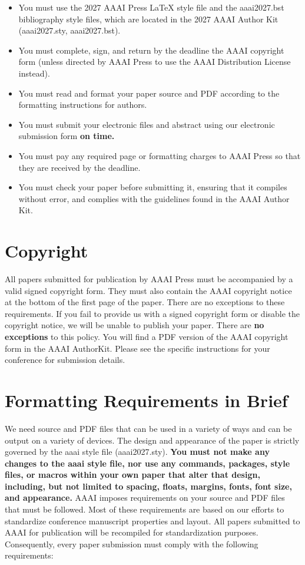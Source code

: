 \documentclass[letterpaper]{article} %
\begin{document}
\begin{itemize}
\item You must use the 2027 AAAI Press \LaTeX{} style file and the aaai2027.bst bibliography style files, which are located in the 2027 AAAI Author Kit (aaai2027.sty, aaai2027.bst).
\item You must complete, sign, and return by the deadline the AAAI copyright form (unless directed by AAAI Press to use the AAAI Distribution License instead).
\item You must read and format your paper source and PDF according to the formatting instructions for authors.
\item You must submit your electronic files and abstract using our electronic submission form \textbf{on time.}
\item You must pay any required page or formatting charges to AAAI Press so that they are received by the deadline.
\item You must check your paper before submitting it, ensuring that it compiles without error, and complies with the guidelines found in the AAAI Author Kit.
\end{itemize}

\section{Copyright}
All papers submitted for publication by AAAI Press must be accompanied by a valid signed copyright form. They must also contain the AAAI copyright notice at the bottom of the first page of the paper. There are no exceptions to these requirements. If you fail to provide us with a signed copyright form or disable the copyright notice, we will be unable to publish your paper. There are \textbf{no exceptions} to this policy. You will find a PDF version of the AAAI copyright form in the AAAI AuthorKit. Please see the specific instructions for your conference for submission details.

\section{Formatting Requirements in Brief}
We need source and PDF files that can be used in a variety of ways and can be output on a variety of devices. The design and appearance of the paper is strictly governed by the aaai style file (aaai2027.sty).
\textbf{You must not make any changes to the aaai style file, nor use any commands, packages, style files, or macros within your own paper that alter that design, including, but not limited to spacing, floats, margins, fonts, font size, and appearance.} AAAI imposes requirements on your source and PDF files that must be followed. Most of these requirements are based on our efforts to standardize conference manuscript properties and layout. All papers submitted to AAAI for publication will be recompiled for standardization purposes. Consequently, every paper submission must comply with the following requirements:
\end{document}
